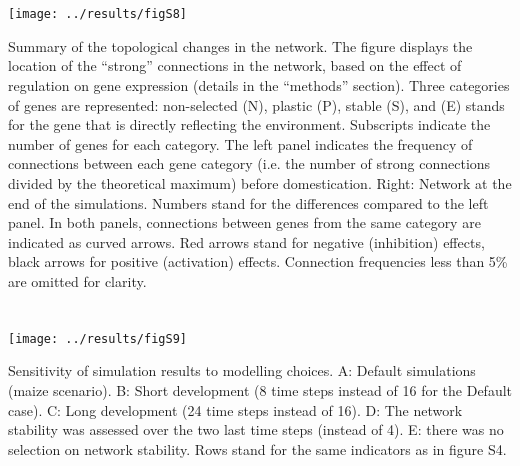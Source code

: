 \documentclass[10pt,a4paper]{article}
\begin{document}
\section{}

\vspace{2cm}

\begin{center}
\texttt{[image: ../results/figS8]}
\end{center}

\vspace{2cm}

Summary of the topological changes in the network. The figure displays the location of the “strong” connections in the network, based on the effect of regulation on gene expression (details in the “methods” section). Three categories of genes are represented: non-selected (N), plastic (P), stable (S), and (E) stands for the gene that is directly reflecting the environment. Subscripts indicate the number of genes for each category.  The left panel indicates the frequency of connections between each gene category (i.e. the number of strong connections divided by the theoretical maximum) before domestication. Right: Network at the end of the simulations. Numbers stand for the differences compared to the left panel. In both panels, connections between genes from the same category are indicated as curved arrows. Red arrows stand for negative (inhibition) effects, black arrows for positive (activation) effects. Connection frequencies less than 5\% are omitted for clarity.

\clearpage

\section{}

\begin{center}
\texttt{[image: ../results/figS9]}
\end{center}

Sensitivity of simulation results to modelling choices. A: Default simulations (maize scenario). B: Short development (8 time steps instead of 16 for the Default case). C: Long development (24 time steps instead of 16). D: The network stability was assessed over the two last time steps (instead of 4). E: there was no selection on network stability. Rows stand for the same indicators as in figure S4. 
\end{document}
